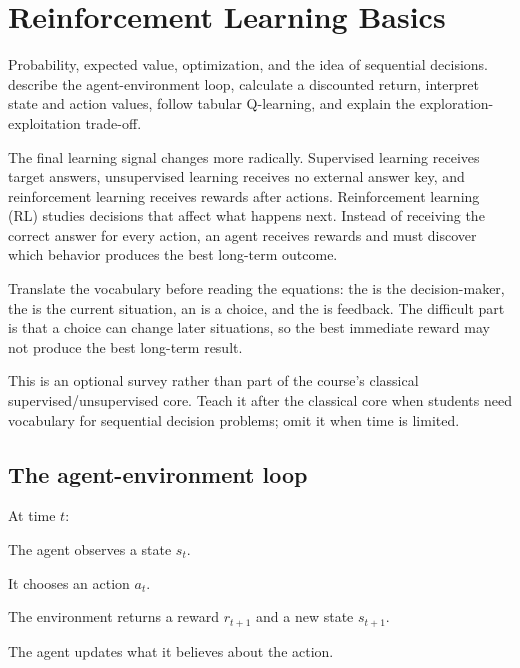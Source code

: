 \chapter{Reinforcement Learning Basics}
\label{ch:rl}

\chapterguide%
  {Probability, expected value, optimization, and the idea of sequential decisions.}
  {describe the agent-environment loop, calculate a discounted return, interpret state and action values, follow tabular Q-learning, and explain the exploration-exploitation trade-off.}

The final learning signal changes more radically. Supervised learning receives target answers, unsupervised learning receives no external answer key, and reinforcement learning receives rewards after actions. Reinforcement learning (RL) studies decisions that affect what happens next. Instead of receiving the correct answer for every action, an agent receives rewards and must discover which behavior produces the best long-term outcome.

\begin{firstread}
Translate the vocabulary before reading the equations: the  is the decision-maker, the  is the current situation, an  is a choice, and the  is feedback. The difficult part is that a choice can change later situations, so the best immediate reward may not produce the best long-term result.
\end{firstread}

\begin{optionaltopic}
This is an optional survey rather than part of the course's classical supervised/unsupervised core. Teach it after the classical core when students need vocabulary for sequential decision problems; omit it when time is limited.
\end{optionaltopic}

\section{The agent-environment loop}

At time $t$:

\begin{mlsteps}
  \item The agent observes a state $s_t$.
  \item It chooses an action $a_t$.
  \item The environment returns a reward $r_{t+1}$ and a new state $s_{t+1}$.
  \item The agent updates what it believes about the action.
\end{mlsteps}

